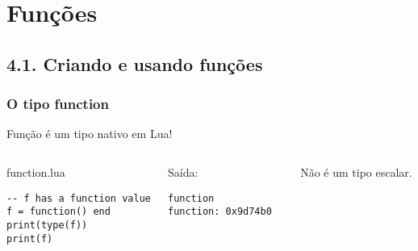 \documentclass[brazil]{beamer}
\begin{document}
\section{Funções}
\subsection{4.1. Criando e usando funções}
\begin{frame}[fragile]
  \frametitle{O tipo function}
  \pause
  \begin{center}
    Função é um tipo nativo em Lua!
  \end{center}
  \pause
  \begin{columns}
      \begin{block}{function.lua}
        \begin{lstlisting}
-- f has a function value
f = function() end
print(type(f))
print(f)
        \end{lstlisting}
      \end{block}
    \pause
      \begin{block}{Saída:}
        \begin{verbatim}
function
function: 0x9d74b0  \end{verbatim}
      \end{block}
      \pause
      Não é um tipo escalar.
  \end{columns}
\end{frame}
\end{document}
